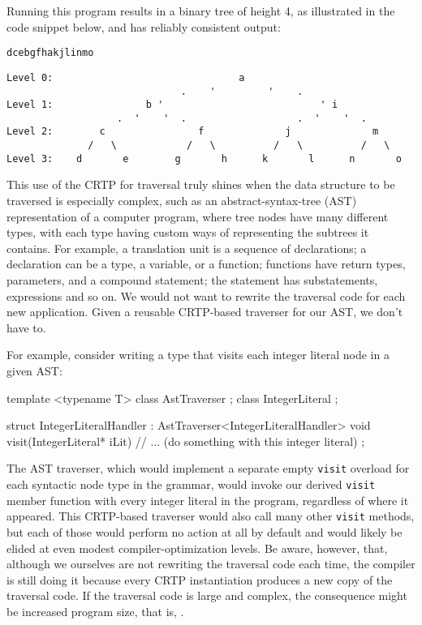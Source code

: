 \noindent Running this program results in a binary tree of height 4, as
illustrated in the code snippet below, and has reliably consistent output:

\begin{lstlisting}[style=plain]
dcebgfhakjlinmo
\end{lstlisting}
    
\begin{lstlisting}[style=plain]
Level 0:                                a
                              .    '         '    .
Level 1:                b '                           ' i
                   .  '    '  .                   .  '    '  .
Level 2:        c                f              j              m
              /   \            /   \          /   \          /   \
Level 3:    d       e        g       h      k       l      n       o
\end{lstlisting}
    
\noindent This use of the CRTP for traversal truly shines when the data structure to
be traversed is especially complex, such as an abstract-syntax-tree
(AST) representation of a computer program, where tree nodes have many
different types, with each type having custom ways of representing the
subtrees it contains. For example, a translation unit is a sequence of
declarations; a declaration can be a type, a variable, or a function;
functions have return types, parameters, and a compound statement; the
statement has substatements, expressions and so on. We would not want
to rewrite the traversal code for each new application. Given a reusable
CRTP-based traverser for our AST, we don't have to.

For example, consider writing a type that visits each integer literal
node in a given AST:

\begin{emcppshiddenlisting}[emcppsbatch=e10]
template <typename T>
class AstTraverser {};
class IntegerLiteral {};
\end{emcppshiddenlisting}
\begin{emcppslisting}[emcppsbatch=e10]
struct IntegerLiteralHandler : AstTraverser<IntegerLiteralHandler>
{
    void visit(IntegerLiteral* iLit)
    {
        // ... (do something with this integer literal)
    }
};
\end{emcppslisting}
    
\noindent The AST traverser, which would implement a separate empty \lstinline!visit!
overload for each syntactic node type in the grammar, would invoke our
derived \lstinline!visit! member function with every integer literal in the
program, regardless of where it appeared. This CRTP-based traverser
would also call many other \lstinline!visit! methods, but each of those would perform no action at all by default and would likely be elided at even modest compiler-optimization levels. Be aware, however, that, although we ourselves are
not rewriting the traversal code each time, the compiler is still doing
it because every CRTP instantiation produces a new copy of the traversal
code. If the traversal code is large and complex, the consequence might
be increased program size, that is, \emcppsgloss{code bloat}.

